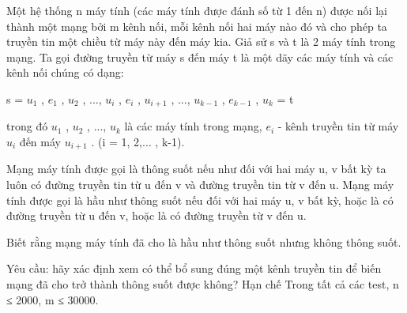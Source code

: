 Một hệ thống n máy tính (các máy tính được đánh số từ 1 đến n) được nối lại thành một mạng bởi m kênh nối, mỗi kênh nối hai máy nào đó và cho phép ta truyền tin một chiều từ máy này đến máy kia. Giả sử s và t là 2 máy tính trong mạng. Ta gọi đường truyền từ máy s đến máy t là một dãy các máy tính và các kênh nối chúng có dạng:  

   s = $u_{1}$   , $e_{1}$   , $u_{2}$   , ..., $u_{i}$   , $e_{i}$   , $u_{i+1}$   , ..., $u_{k-1}$   , $e_{k-1}$   , $u_{k}$   = t  

   trong đó $u_{1}$   , $u_{2}$   , ..., $u_{k}$   là các máy tính trong mạng, $e_{i}$   - kênh truyền tin từ máy $u_{i}$   đến máy $u_{i+1}$   . (i = 1, 2,... , k-1).  

   Mạng máy tính được gọi là thông suốt nếu như đối với hai máy u, v bất kỳ ta luôn có đường truyền tin từ u đến v và đường truyền tin từ v đến u. Mạng máy tính được gọi là hầu như thông suốt nếu đối với hai máy u, v bất kỳ, hoặc là có đường truyền từ u đến v, hoặc là có đường truyền từ v đến u.  

   Biết rằng mạng máy tính đã cho là hầu như thông suốt nhưng không thông suốt.  

   Yêu cầu: hãy xác định xem có thể bổ sung đúng một kênh truyền tin để biến mạng đã cho trở thành thông suốt được không?
Hạn chế
Trong tất cả các test, n ≤ 2000, m ≤ 30000.
